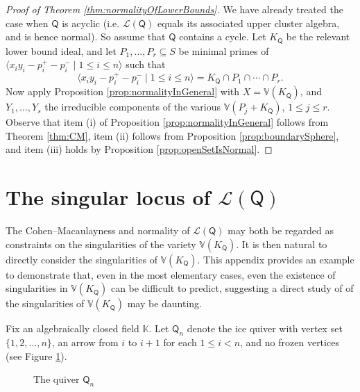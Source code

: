 \documentclass[ALCO,published]{cedram}
\numberwithin{equation}{section}
\renewcommand{\L}{\mathcal{L}}%
\newcommand{\1}{^{-1}}
\def\Q{\mathsf{Q}}
\begin{document}
\begin{proof}[Proof of Theorem \ref{thm:normalityOfLowerBounds}]
We have already treated the case when $\Q$ is acyclic (i.e. $\mathcal{L}(\Q)$ equals its associated upper cluster algebra, and is hence normal). So assume that $\Q$ contains a cycle.
Let $K_\Q$ be the relevant lower bound ideal, and let $P_1,\dots, P_r\subseteq S$ be minimal primes of $\langle x_iy_i-p_i^+-p_i^-\mid 1\leq i\leq n \rangle$ such that 
\[
\langle x_iy_i-p_i^+-p_i^-\mid 1\leq i\leq n \rangle = K_\Q\cap P_1\cap\cdots \cap P_r.
\]
Now apply Proposition \ref{prop:normalityInGeneral} with $X = \mathbb{V}(K_\Q)$, and $Y_1,\dots,Y_s$ the irreducible components of the various $\mathbb{V}(P_j + K_\Q)$, $1\leq j\leq r$. Observe that item (i) of Proposition \ref{prop:normalityInGeneral} follows from Theorem \ref{thm:CM}, item (ii) follows from Proposition \ref{prop:boundarySphere}, and item (iii) holds by Proposition \ref{prop:openSetIsNormal}.
\end{proof}

\appendix

\section{The singular locus of $\L(\Q)$}\label{section: singularity}

The Cohen--Macaulayness and normality of $\L(\Q)$ may both be regarded as constraints on the singularities of the variety $\mathbb{V}(K_\Q)$.  It is then natural to directly consider the singularities of $\mathbb{V}(K_\Q)$.
This appendix provides an example to demonstrate that, even in the most elementary cases, even the existence of singularities in $\mathbb{V}(K_\Q)$ can be difficult to predict, suggesting a direct study of of the singularities of $\mathbb{V}(K_\Q)$ may be daunting.

Fix an algebraically closed field $\mathbb{K}$.
Let $\Q_n$ denote the ice quiver with vertex set $\{1,2,\dots,n\}$, an arrow from $i$ to $i+1$ for each $1\leq i <n$, and no frozen vertices (see Figure \ref{fig: Atype}).  

\begin{figure}[h!t]
\caption{The quiver $\Q_n$}
\label{fig: Atype}
\end{figure}
\end{document}

